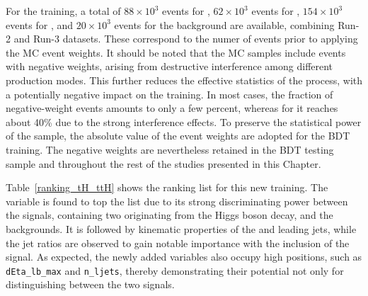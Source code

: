 For the training, a total of $88\times10^{3}$ events for \ttH, $62\times10^{3}$  events for \thqb, $154\times10^{3}$  events for \ztautau, and $20\times10^{3}$  events for the \ttbar background are available, combining Run-2 and Run-3 datasets. These correspond to the numer of events prior to applying the MC event weights. It should be noted that the MC samples include events with negative weights, arising from destructive interference among different production modes. This further reduces the effective statistics of the process, with a potentially negative impact on the training. In most cases, the fraction of negative-weight events amounts to only a few percent, whereas for \thqb it reaches about 40\% due to the strong interference effects. To preserve the statistical power of the \thqb sample, the absolute value of the event weights are adopted for the BDT training. The negative weights are nevertheless retained in the BDT testing sample and throughout the rest of the studies presented in this Chapter.

Table~\ref{ranking_tH_ttH} shows the ranking list for this new training. The \mmc variable is found to top the list due to its strong discriminating power between the signals, containing two \tauhad originating from the Higgs boson decay, and the backgrounds. 
It is followed by kinematic properties of the \tauhad and leading jets, while the jet \pt ratios are observed to gain notable importance with the inclusion of the \thtt signal. As expected, the newly added variables also occupy high positions, such as \texttt{dEta\_lb\_max} and \texttt{n\_ljets}, thereby demonstrating their potential not only for distinguishing between the two signals.

